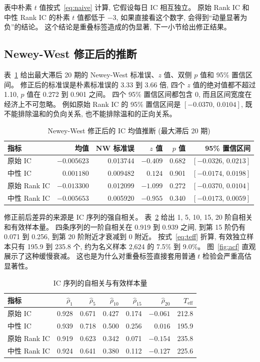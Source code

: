 \documentclass[11pt,a4paper]{article}
\begin{document}
表中朴素 $t$ 值按式~\eqref{eq:naive} 计算, 它假设每日 IC 相互独立。
原始 Rank IC 和中性 Rank IC 的朴素 $t$ 值都低于 $-3$, 如果直接看这个数字, 会得到“动量显著为负”的结论。
这个结论是重叠标签造成的伪显著, 下一小节给出修正结果。

\subsection{Newey-West 修正后的推断}

表~\ref{tab:nw} 给出最大滞后 20 期的 Newey-West 标准误、$z$ 值、双侧 $p$ 值和 95\% 置信区间。
修正后的标准误是朴素标准误的 3.33 到 3.66 倍, 四个 $z$ 值的绝对值都不超过 1.10, $p$ 值在 0.272 到 0.901 之间。
四个 95\% 置信区间都包含 0, 而且区间宽度在经济上不可忽略。
例如原始 Rank IC 的 95\% 置信区间是 $[-0.0370,\,0.0104]$, 既不能排除温和的负向关系, 也不能排除温和的正向关系。

\begin{table}[H]
\centering
\caption{Newey-West 修正后的 IC 均值推断 (最大滞后 20 期)}
\label{tab:nw}
\begin{tabular}{lrrrrr}
\toprule
指标 & 均值 & NW 标准误 & $z$ 值 & $p$ 值 & 95\% 置信区间 \\
\midrule
原始 IC & $-0.005623$ & 0.013744 & $-0.409$ & 0.682 & $[-0.0326,\,0.0213]$ \\
中性 IC & $0.001180$ & 0.009482 & $0.124$ & 0.901 & $[-0.0174,\,0.0198]$ \\
原始 Rank IC & $-0.013300$ & 0.012099 & $-1.099$ & 0.272 & $[-0.0370,\,0.0104]$ \\
中性 Rank IC & $-0.005653$ & 0.005920 & $-0.955$ & 0.340 & $[-0.0173,\,0.0059]$ \\
\bottomrule
\end{tabular}
\end{table}

修正前后差异的来源是 IC 序列的强自相关。
表~\ref{tab:acf} 给出 1, 5, 10, 15, 20 阶自相关和有效样本量。
四条序列的一阶自相关在 0.919 到 0.939 之间, 到第 15 阶仍有 0.071 到 0.256, 到第 20 阶附近才衰减到 0 附近。
按式~\eqref{eq:teff} 折算, 有效独立样本只有 195.9 到 235.8 个, 约为名义样本 2{,}624 的 7.5\% 到 9.0\%。
图~\ref{fig:acf} 直观展示了这种缓慢衰减。
这也是为什么对重叠标签直接套用普通 $t$ 检验会严重高估显著性。

\begin{table}[H]
\centering
\caption{IC 序列的自相关与有效样本量}
\label{tab:acf}
\begin{tabular}{lrrrrrr}
\toprule
指标 & $\hat\rho_1$ & $\hat\rho_5$ & $\hat\rho_{10}$ & $\hat\rho_{15}$ & $\hat\rho_{20}$ & $T_{\mathrm{eff}}$ \\
\midrule
原始 IC & 0.928 & 0.671 & 0.427 & 0.174 & $-0.061$ & 212.8 \\
中性 IC & 0.939 & 0.718 & 0.500 & 0.256 & $0.016$ & 195.9 \\
原始 Rank IC & 0.919 & 0.623 & 0.342 & 0.071 & $-0.154$ & 235.8 \\
中性 Rank IC & 0.924 & 0.641 & 0.380 & 0.112 & $-0.127$ & 225.6 \\
\bottomrule
\end{tabular}
\end{table}
\end{document}
